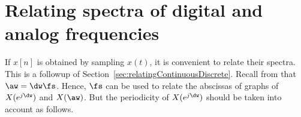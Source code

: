 


\section{Relating spectra of digital and analog frequencies}


If $x[n]$ is obtained by sampling $x(t)$, it is convenient to relate their spectra. This is
a followup of Section~\ref{sec:relatingContinuousDiscrete}.
Recall from  that $\aw = \dw \fs$. Hence, $\fs$ can be used to relate the abscissas of graphs of $X(e^{j\dw})$ and $X(\aw)$. But the periodicity of $X(e^{j\dw})$ should be taken into account as follows.

